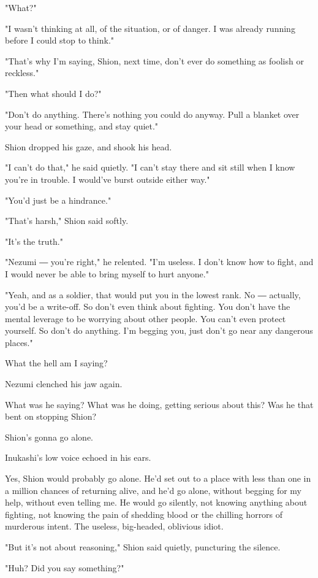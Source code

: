 "What?"

"I wasn't thinking at all, of the situation, or of danger. I was already
running before I could stop to think."

"That's why I'm saying, Shion, next time, don't ever do something as
foolish or reckless."

"Then what should I do?"

"Don't do anything. There's nothing you could do anyway. Pull a blanket
over your head or something, and stay quiet."

Shion dropped his gaze, and shook his head.

"I can't do that," he said quietly. "I can't stay there and sit still
when I know you're in trouble. I would've burst outside either way."

"You'd just be a hindrance."

"That's harsh," Shion said softly.

"It's the truth."

"Nezumi ― you're right," he relented. "I'm useless. I don't know how to
fight, and I would never be able to bring myself to hurt anyone."

"Yeah, and as a soldier, that would put you in the lowest rank. No ―
actually, you'd be a write-off. So don't even think about fighting. You
don't have the mental leverage to be worrying about other people. You
can't even protect yourself. So don't do anything. I'm begging you, just
don't go near any dangerous places."

What the hell am I saying?

Nezumi clenched his jaw again.

What was he saying? What was he doing, getting serious about this? Was
he that bent on stopping Shion?

Shion's gonna go alone.

Inukashi's low voice echoed in his ears.

Yes, Shion would probably go alone. He'd set out to a place with less
than one in a million chances of returning alive, and he'd go alone,
without begging for my help, without even telling me. He would go
silently, not knowing anything about fighting, not knowing the pain of
shedding blood or the chilling horrors of murderous intent. The useless,
big-headed, oblivious idiot.

"But it's not about reasoning," Shion said quietly, puncturing the
silence.

"Huh? Did you say something?"

